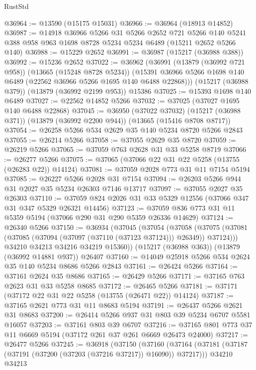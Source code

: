 \begin{lexlean}{RustStd}
\begin{coremodule}
@36964 := @13590 (@15175 @15031)
@36966 := @36964 (@18913 @14852)
@36987 := @14918
    @36966
    @5266
    @31
    @5266
    @2652
    @721
    @5266
    @140
    @5241
    @388
    @958
    @963
    @1698
    @8728
    @5234
    @5234
    @6489
    (@15211 @2652 @5266 @140)
@36988 := @15229 @2652
@36991 := @36987 (@15217 (@36988 @388))
@36992 := @15236 @2652
@37022 := @36962
    (@36991
      (@13879 (@36992 @721 @958))
      (@13665 (@15248 @8728 @5234))
      (@15391 @36966 @5266 @1698 @140 @6489 (@22562 @36966 @5266 @1695 @140 @6488 @22868)))
    (@15217 (@36988 @379))
    (@13879 (@36992 @2199 @953))
    @15386
@37025 := @15393 @1698 @140 @6489
@37027 := @22562 @14852 @5266
@37032 := @37025 (@37027 @1695 @140 @6488 @22868)
@37045 := @36950
    (@37022 @37032)
    (@15217 (@36988 @371))
    (@13879 (@36992 @2200 @944))
    (@13665 (@15416 @8708 @8717))
@37054 := @26258 @5266 @534 @2629 @35 @140 @5234 @8720 @5266 @2843
@37055 := @26214 @5266
@37058 := @37055 @2629 @35 @8720
@37059 := @26219 @5266
@37065 := @37059 @763 @2628 @31 @33 @5258 @8719
@37066 := @26277 @5266
@37075 := @37065 (@37066 @22 @31 @22 @5258 (@13755 (@26283 @22)) @14124)
@37081 := @37059 @2028 @773 @31 @11 @7154 @5194
@37085 := @26227 @5266 @2028 @31 @7154
@37094 := @26203 @5266 @944 @31 @2027 @35 @5234 @26303 @7146 @13717
@37097 := @37055 @2027 @35 @26303
@37110 := @37059 @824 @2026 @31 @33 @5329 @12556 (@37066 @347 @31 @347 @5329 @26321 @14456)
@37123 := @37059 @836 @773 @31 @11 @5359 @5194 (@37066 @290 @31 @290 @5359 @26336 @14629)
@37124 := @26340 @5266
@37150 := @36934
    (@37045
      (@37054
        (@37058 (@37075 (@37081 (@37085 (@37094 (@37097 (@37110 (@37123 @37124))) @26349)) @37124)))
        @34210
        @34213
        @34216
        @34219
        @15360))
    (@15217 (@36988 @363))
    (@13879 (@36992 @14881 @937))
    @26407
@37160 := @14049 @25918 @5266 @534 @2624 @35 @140 @5234 @8686 @5266 @2843
@37161 := @26424 @5266
@37164 := @37161 @2624 @35 @8686
@37165 := @26429 @5266
@37171 := @37165 @763 @2623 @31 @33 @5258 @8685
@37172 := @26465 @5266
@37181 := @37171 (@37172 @22 @31 @22 @5258 (@13755 (@26471 @22)) @14124)
@37187 := @37165 @2621 @773 @31 @11 @8683 @5194
@37191 := @26437 @5266 @2621 @31 @8683
@37200 := @26414 @5266 @937 @31 @803 @39 @5234 @6707 @5581 @16057
@37203 := @37161 @803 @39 @6707
@37216 := @37165 @801 @773 @37 @11 @6669 @5194 (@37172 @261 @37 @261 @6669 @26473 @24000)
@37217 := @26477 @5266
@37245 := @36918
    (@37150
      (@37160
        (@37164 (@37181 (@37187 (@37191 (@37200 (@37203 (@37216 @37217)) @16090)) @37217)))
        @34210
        @34213

\end{coremodule}
\end{lexlean}
